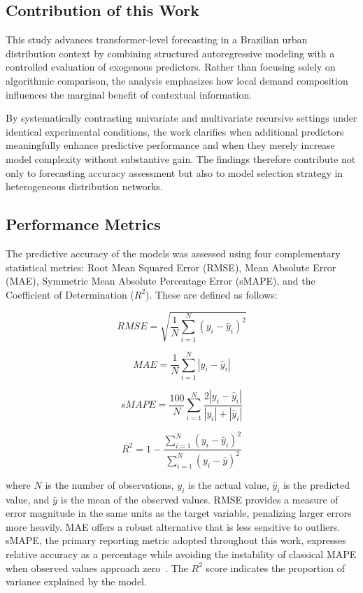 \subsection{Contribution of this Work}

This study advances transformer-level forecasting in a Brazilian urban distribution context by combining structured autoregressive modeling with a controlled evaluation of exogenous predictors. Rather than focusing solely on algorithmic comparison, the analysis emphasizes how local demand composition influences the marginal benefit of contextual information.

By systematically contrasting univariate and multivariate recursive settings under identical experimental conditions, the work clarifies when additional predictors meaningfully enhance predictive performance and when they merely increase model complexity without substantive gain. The findings therefore contribute not only to forecasting accuracy assessment but also to model selection strategy in heterogeneous distribution networks.

\subsection{Performance Metrics}
The predictive accuracy of the models was assessed using four complementary statistical metrics: Root Mean Squared Error (RMSE), Mean Absolute Error (MAE), Symmetric Mean Absolute Percentage Error (sMAPE), and the Coefficient of Determination ($R^2$). These are defined as follows:

\begin{equation}
RMSE = \sqrt{\frac{1}{N} \sum_{i=1}^{N} (y_i - \hat{y}_i)^2}
\end{equation}

\begin{equation}
MAE = \frac{1}{N} \sum_{i=1}^{N} \left| y_i - \hat{y}_i \right|
\end{equation}

\begin{equation}
sMAPE = \frac{100}{N} \sum_{i=1}^{N} \frac{2\left| y_i - \hat{y}_i \right|}{|y_i| + |\hat{y}_i|}
\end{equation}

\begin{equation}
R^2 = 1 - \frac{\sum_{i=1}^{N} (y_i - \hat{y}_i)^2}{\sum_{i=1}^{N} (y_i - \bar{y})^2}
\end{equation}

\noindent where $N$ is the number of observations, $y_i$ is the actual value, $\hat{y}_i$ is the predicted value, and $\bar{y}$ is the mean of the observed values. RMSE provides a measure of error magnitude in the same units as the target variable, penalizing larger errors more heavily. MAE offers a robust alternative that is less sensitive to outliers. sMAPE, the primary reporting metric adopted throughout this work, expresses relative accuracy as a percentage while avoiding the instability of classical MAPE when observed values approach zero~\cite{Makridakis1993}. The $R^2$ score indicates the proportion of variance explained by the model.

